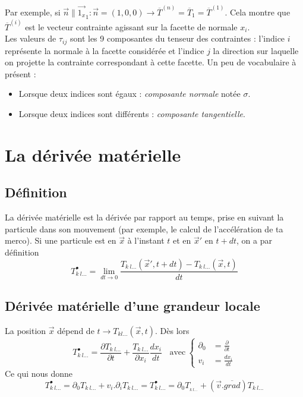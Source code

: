     \newpage
    Par exemple, si $\vec{n} \parallel \vec{1_x}_{1} : \vec{n} = (1,0,0) \rightarrow  \overline{T}^{(n)} =
     \overline{T}_1 =  \overline{T}^{(1)}$. Cela montre que $ \overline{T}^{(i)}$ est le vecteur contrainte
     agissant sur la facette de normale $x_i$.\\
     
     Les valeurs de $\tau_{ij}$ sont les 9 composantes du tenseur des contraintes : l'indice $i$ représente
     la normale à la facette considérée et l'indice $j$ la direction sur laquelle on projette la contrainte
     correspondant à cette facette. Un peu de vocabulaire à présent :
     \begin{itemize}
     \item Lorsque deux indices sont égaux : \textit{composante normale} notée $\sigma$.
     \item Lorsque deux indices sont différents : \textit{composante tangentielle}.
     \end{itemize}
    
    
    
    
\section{La dérivée matérielle}
    \subsection{Définition}
    La dérivée matérielle est la dérivée par rapport au temps, prise en suivant la particule dans son 
    mouvement (par exemple, le calcul de l'accélération de ta merco). Si une particule est en $\vec{x}$
    à l'instant $t$ et en $\vec{x}'$ en $t+dt$, on a par définition
    \begin{equation}
    T_{k\ l\dots}^\bullet = \lim\limits_{dt \rightarrow 0} \dfrac{T_{k\ l\dots}(\vec{x}',t+dt) - T_{k\ l\dots}
    (\vec x,t)}{dt}
    \end{equation}
    
    \subsection{Dérivée matérielle d'une grandeur locale}
    La position $\vec{x}$ dépend de $t \rightarrow T_{kl\dots} (\vec{x},t)$. Dès lors
    \begin{equation}
    T_{k\ l\dots}^\bullet = \frac{\partial T_{k\ l\dots}}{\partial t} + \frac{T_{k\ l\dots}}{\partial x_i}
    \frac{dx_i}{dt}\ \ \ \ \text{avec}\ \left\{\begin{array}{ll}
    \partial_0 &= \frac{\partial}{\partial t}  \\
    v_i &= \frac{dx_i}{dt} 
    \end{array}\right.
    \end{equation}
    Ce qui nous donne 
    \begin{equation}
    T_{k\ l\dots}^\bullet = \partial_0T_{k\ l\dots} + v_i.\partial_iT_{k\ l\dots} = T_{k\ l\dots}^\bullet = \partial_0T__{k\ l\dots} +
    (\vec v.\overline{grad})T_{k\ l\dots}
    \end{equation}
    
